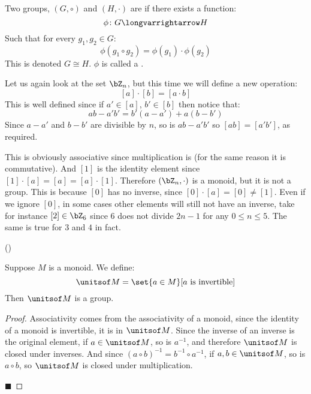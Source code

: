 \documentclass[10pt]{article}
\begin{document}
\begin{defn*}

    Two groups, $(G,\circ)$ and $(H,\cdot)$ are  if there exists a function:
        \[ \phi\colon G\longvarrightarrow H \]
    Such that for every $g_1,g_2\in G$:
        \[ \phi(g_1\circ g_2) = \phi(g_1)\cdot\phi(g_2) \]
    This is denoted $G\cong H$.
    $\phi$ is called a .

\end{defn*}

\begin{exam}

    Let us again look at the set $\bZ_n$, but this time we will define a new operation:
        \[ [a]\cdot[b] = [a\cdot b] \]
    This is well defined since if $a'\in[a]$, $b'\in[b]$ then notice that:
        \[ ab - a'b' = b'(a-a') + a(b-b') \]
    Since $a-a'$ and $b-b'$ are divisible by $n$, so is $ab-a'b'$ so $[ab]=[a'b']$, as required.

    This is obviously associative since multiplication is (for the same reason it is commutative).
    And $[1]$ is the identity element since $[1]\cdot[a]=[a]=[a]\cdot[1]$.
    Therefore $(\bZ_n,\cdot)$ is a monoid, but it is not a group.
    This is because $[0]$ has no inverse, since $[0]\cdot[a]=[0]\neq[1]$.
    Even if we ignore $[0]$, in some cases other elements will still not have an inverse, take for instance $[2]\in\bZ_6$ since $6$ does not divide $2n-1$ for any
    $0\leq n\leq 5$.
    The same is true for $3$ and $4$ in fact.

\end{exam}

(\vert)
\begin{prop*}

    Suppose $M$ is a monoid.
    We define:
        \[ \unitsof M = \set{a\in M}[a \text{ is invertible}] \]
    Then $\unitsof M$ is a group.

\end{prop*}

\begin{proof}

    Associativity comes from the associativity of a monoid, since the identity of a monoid is invertible, it is in $\unitsof M$.
    Since the inverse of an inverse is the original element, if $a\in\unitsof M$, so is $a^{-1}$, and therefore $\unitsof M$ is closed under inverses.
    And since $(a\circ b)^{-1}=b^{-1}\circ a^{-1}$, if $a,b\in\unitsof M$, so is $a\circ b$, so $\unitsof M$ is closed under multiplication.

    \hfill$\blacksquare$

\end{proof}
\end{document}
